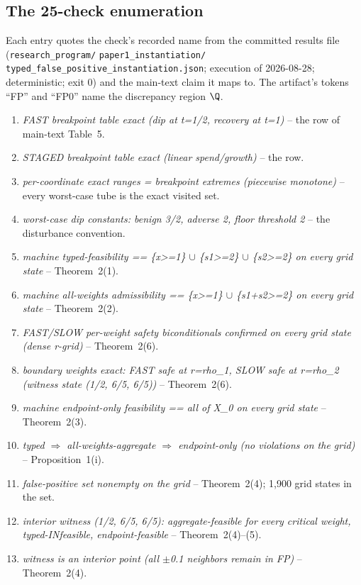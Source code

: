 \subsection{The 25-check enumeration}

Each entry quotes the check's recorded name from the committed results file (\texttt{research\_program/} \texttt{paper1\_instantiation/} \texttt{typed\_false\_positive\_instantiation.json}; execution of 2026-08-28; deterministic; exit 0) and the main-text claim it maps to. The artifact's tokens ``FP'' and ``FP0'' name the discrepancy region $\Q$.
\begin{enumerate}[leftmargin=2em,itemsep=1pt]
\item \emph{FAST breakpoint table exact (dip at t=1/2, recovery at t=1)} -- the  row of main-text Table~5.
\item \emph{STAGED breakpoint table exact (linear spend/growth)} -- the  row.
\item \emph{per-coordinate exact ranges = breakpoint extremes (piecewise monotone)} -- every worst-case tube is the exact visited set.
\item \emph{worst-case dip constants: benign 3/2, adverse 2, floor threshold 2} -- the disturbance convention.
\item \emph{machine typed-feasibility == \{x>=1\} $\cup$ \{s1>=2\} $\cup$ \{s2>=2\} on every grid state} -- Theorem~2(1).
\item \emph{machine all-weights admissibility == \{x>=1\} $\cup$ \{s1+s2>=2\} on every grid state} -- Theorem~2(2).
\item \emph{FAST/SLOW per-weight safety biconditionals confirmed on every grid state (dense r-grid)} -- Theorem~2(6).
\item \emph{boundary weights exact: FAST safe at r=rho\_1, SLOW safe at r=rho\_2 (witness state (1/2, 6/5, 6/5))} -- Theorem~2(6).
\item \emph{machine endpoint-only feasibility == all of X\_0 on every grid state} -- Theorem~2(3).
\item \emph{typed $\Rightarrow$ all-weights-aggregate $\Rightarrow$ endpoint-only (no violations on the grid)} -- Proposition~1(i).
\item \emph{false-positive set nonempty on the grid} -- Theorem~2(4); 1,900 grid states in the set.
\item \emph{interior witness (1/2, 6/5, 6/5): aggregate-feasible for every critical weight, typed-INfeasible, endpoint-feasible} -- Theorem~2(4)--(5).
\item \emph{witness is an interior point (all $\pm$0.1 neighbors remain in FP)} -- Theorem~2(4).

\end{enumerate}
